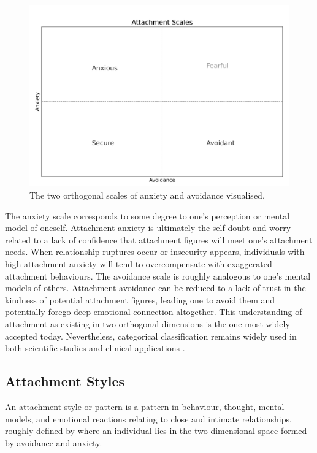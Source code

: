 \documentclass[12pt]{report}
\begin{document}
\begin{figure}
    \includegraphics[width=\textwidth]{figures/attachment_scales.png}
    \caption{The two orthogonal scales of anxiety and avoidance visualised.}
    \label{fig: attachment scales}
\end{figure}

The anxiety scale corresponds to some degree to one's perception or mental model of oneself. Attachment anxiety is ultimately the self-doubt and worry related to a lack of confidence that attachment figures will meet one's attachment needs.
When relationship ruptures occur or insecurity appears, individuals with high attachment anxiety will tend to overcompensate with exaggerated attachment behaviours.
The avoidance scale is roughly analogous to one's mental models of others. Attachment avoidance can be reduced to a lack of trust in the kindness of potential attachment figures, leading one to avoid them and potentially forego deep emotional connection altogether.
This understanding of attachment as existing in two orthogonal dimensions is the one most widely accepted today.
Nevertheless, categorical classification remains widely used in both scientific studies and clinical applications \cite{Mikulincer2013}.

\subsection*{Attachment Styles}
An attachment style or pattern is a pattern in behaviour, thought, mental models, and emotional reactions relating to close and intimate relationships, roughly defined by where an individual lies in the two-dimensional space formed by avoidance and anxiety.
\end{document}
